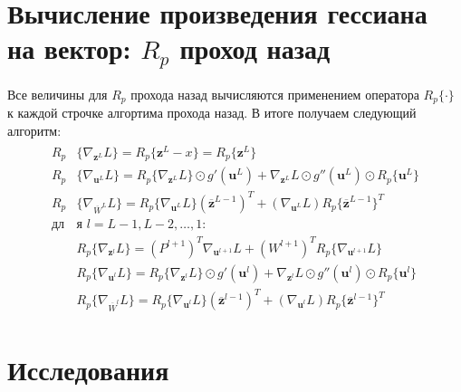 \documentclass[12pt, a4paper]{article}
\begin{document}
    \section{Вычисление произведения гессиана на вектор: $R_p$ проход назад}
        Все величины для $R_p$ прохода назад вычисляются применением оператора $R_p\{\cdot\}$ к каждой строчке алгортима прохода назад. В итоге получаем следующий алгоритм:
        \begin{gather}
        \begin{align*}
            R_p&\{\nabla_{\boldsymbol{z}^L}L\} = R_p\{\boldsymbol{z}^L - x\} = R_p\{\boldsymbol{z}^L\}\\
            R_p&\{\nabla_{\boldsymbol{u}^L}L\} = R_p\{\nabla_{\boldsymbol{z}^L}L\} \odot g'(\boldsymbol{u}^L) + \nabla_{\boldsymbol{z}^L}L \odot g''(\boldsymbol{u}^L) \odot R_p\{\boldsymbol{u}^L\}\\
            R_p&\{\nabla_{\overline{W}^L}L\} = R_p\{\nabla_{\boldsymbol{u}^L}L\} (\overline{\boldsymbol{z}}^{L-1})^T + (\nabla_{\boldsymbol{u}^L}L) R_p\{\overline{\boldsymbol{z}}^{L-1}\}^T\\
            \textbf{дл}&\textbf{я } l = L-1, L-2, \dots, 1\text{:}\\
            &R_p\{\nabla_{\boldsymbol{z}^l}L\} = (P^{l+1})^T \nabla_{\boldsymbol{u}^{l+1}}L + (W^{l+1})^T R_p\{\nabla_{\boldsymbol{u}^{l+1}}L\}\\
            &R_p\{\nabla_{\boldsymbol{u}^l}L\} = R_p\{\nabla_{\boldsymbol{z}^l}L\} \odot g'(\boldsymbol{u}^l) + \nabla_{\boldsymbol{z}^l}L \odot g''(\boldsymbol{u}^l) \odot R_p\{\boldsymbol{u}^l\}\\
            &R_p\{\nabla_{\overline{W}^l}L\} = R_p\{\nabla_{\boldsymbol{u}^l}L\} (\overline{\boldsymbol{z}}^{l-1})^T + (\nabla_{\boldsymbol{u}^l}L) R_p\{\overline{\boldsymbol{z}}^{l-1}\}^T
        \end{align*}
        \end{gather}

    \section{Исследования}
\end{document}
